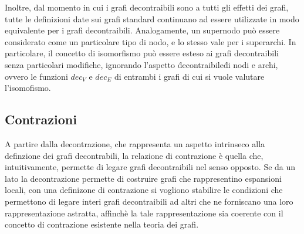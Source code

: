     \begin{figure}[H]
      \centering
      
      \label{fig:dec-graph-example}
    \end{figure}

    Inoltre, dal momento in cui i grafi decontraibili sono a tutti gli effetti dei grafi, tutte le
    definizioni date sui grafi standard continuano ad essere utilizzate in modo equivalente per i grafi decontraibili.
    Analogamente, un supernodo pu\`o essere considerato come un particolare tipo di nodo, e lo stesso vale per i
    superarchi.
    In particolare, il concetto di isomorfismo pu\`o essere esteso ai grafi decontraibili senza particolari modifiche,
    ignorando l'aspetto \"decontraibile\" di nodi e archi, ovvero le funzioni $dec_V$ e $dec_E$ di entrambi i grafi
    di cui si vuole valutare l'isomofismo.




    \subsection{Contrazioni}\label{subsec:contrazioni}
    A partire dalla decontrazione, che rappresenta un aspetto intrinseco alla definzione dei grafi decontrabili,
    la relazione di contrazione \`e quella che, intuitivamente, permette di legare grafi decontraibili nel senso
    opposto.
    Se da un lato la decontrazione permette di costruire grafi che rappresentino espansioni locali, con una
    definizone di contrazione si vogliono stabilire le condizioni che permettono di legare interi grafi decontraibili
    ad altri che ne forniscano una loro rappresentazione astratta, affinch\`e la tale rappresentazione
    sia coerente con il concetto di contrazione esistente nella teoria dei grafi.

